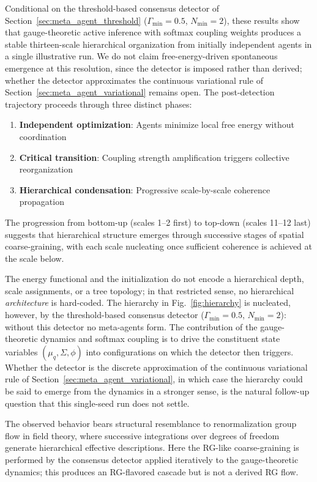 \documentclass[11pt]{article}
\begin{document}
Conditional on the threshold-based consensus detector of Section~\ref{sec:meta_agent_threshold} ($\Gamma_{\min} = 0.5$, $N_{\min} = 2$), these results show that gauge-theoretic active inference with softmax coupling weights produces a stable thirteen-scale hierarchical organization from initially independent agents in a single illustrative run. We do not claim free-energy-driven spontaneous emergence at this resolution, since the detector is imposed rather than derived; whether the detector approximates the continuous variational rule of Section~\ref{sec:meta_agent_variational} remains open. The post-detection trajectory proceeds through three distinct phases:
\begin{enumerate}
\item \textbf{Independent optimization}: Agents minimize local free energy without coordination
\item \textbf{Critical transition}: Coupling strength amplification triggers collective reorganization
\item \textbf{Hierarchical condensation}: Progressive scale-by-scale coherence propagation
\end{enumerate}

The progression from bottom-up (scales 1--2 first) to top-down (scales 11--12 last) suggests that hierarchical structure emerges through successive stages of spatial coarse-graining, with each scale nucleating once sufficient coherence is achieved at the scale below.

The energy functional and the initialization do not encode a hierarchical depth, scale assignments, or a tree topology; in that restricted sense, no hierarchical \emph{architecture} is hard-coded. The hierarchy in Fig.~\ref{fig:hierarchy} is nucleated, however, by the threshold-based consensus detector ($\Gamma_{\min} = 0.5$, $N_{\min} = 2$): without this detector no meta-agents form. The contribution of the gauge-theoretic dynamics and softmax coupling is to drive the constituent state variables $(\mu_q, \Sigma, \phi)$ into configurations on which the detector then triggers. Whether the detector is the discrete approximation of the continuous variational rule of Section~\ref{sec:meta_agent_variational}, in which case the hierarchy could be said to emerge from the dynamics in a stronger sense, is the natural follow-up question that this single-seed run does not settle.

The observed behavior bears structural resemblance to renormalization group flow in field theory, where successive integrations over degrees of freedom generate hierarchical effective descriptions. Here the RG-like coarse-graining is performed by the consensus detector applied iteratively to the gauge-theoretic dynamics; this produces an RG-flavored cascade but is not a derived RG flow.
\end{document}

